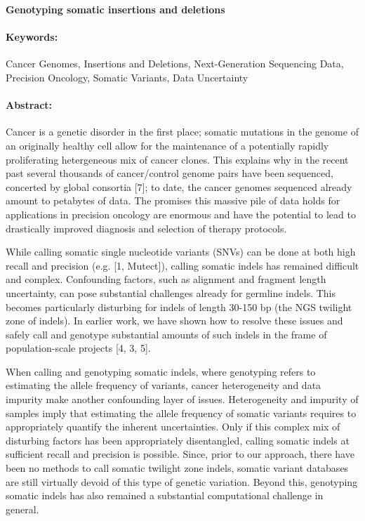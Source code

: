 \noindent
\large {\bf Genotyping somatic insertions and deletions} 


\normalsize 


\noindent \paragraph{Keywords:} Cancer Genomes, Insertions and Deletions, Next-Generation Sequencing Data, Precision
Oncology, Somatic Variants, Data Uncertainty

\noindent \paragraph{Abstract:} 


Cancer is a genetic disorder in the first place; somatic mutations in the genome of an originally healthy cell allow for the maintenance of a potentially rapidly proliferating hetergeneous mix of cancer
clones. This explains why in the recent past several thousands of cancer/control genome pairs have been
sequenced, concerted by global consortia [7]; to date, the cancer genomes sequenced already amount to
petabytes of data. The promises this massive pile of data holds for applications in precision oncology are
enormous and have the potential to lead to drastically improved diagnosis and selection of therapy protocols.

While calling somatic single nucleotide variants (SNVs) can be done at both high recall and precision
(e.g. [1, Mutect]), calling somatic indels has remained difficult and complex. Confounding factors, such as
alignment and fragment length uncertainty, can pose substantial challenges already for germline indels. This
becomes particularly disturbing for indels of length 30-150 bp (the NGS twilight zone of indels). In earlier
work, we have shown how to resolve these issues and safely call and genotype substantial amounts of such
indels in the frame of population-scale projects [4, 3, 5].

When calling and genotyping somatic indels, where genotyping refers to estimating the allele frequency
of variants, cancer heterogeneity and data impurity make another confounding layer of issues. Heterogeneity and impurity of samples imply that estimating the allele frequency of somatic variants requires to
appropriately quantify the inherent uncertainties. Only if this complex mix of disturbing factors has been
appropriately disentangled, calling somatic indels at sufficient recall and precision is possible. Since, prior
to our approach, there have been no methods to call somatic twilight zone indels, somatic variant databases
are still virtually devoid of this type of genetic variation. Beyond this, genotyping somatic indels has also
remained a substantial computational challenge in general.

